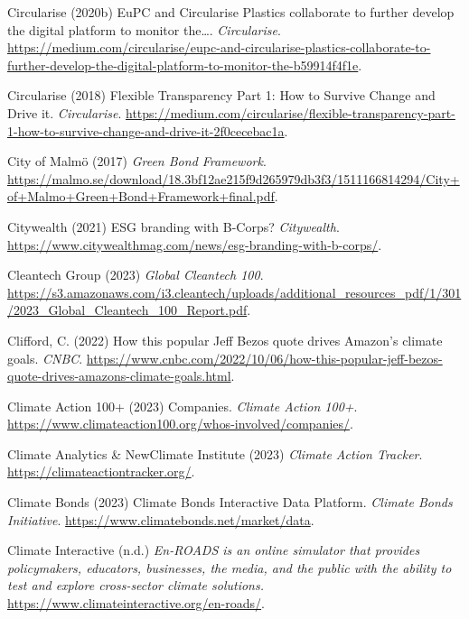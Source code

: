 \documentclass[
  letterpaper,
  DIV=11,
  numbers=noendperiod]{scrartcl}
\newlength{\cslhangindent}
\newenvironment{CSLReferences}[2] %
 {\begin{list}{}{%
  \setlength{\itemindent}{0pt}
  \setlength{\leftmargin}{0pt}
  \setlength{\parsep}{0pt}
  \ifodd #1
   \setlength{\leftmargin}{\cslhangindent}
   \setlength{\itemindent}{-1\cslhangindent}
  \fi
  \setlength{\itemsep}{#2\baselineskip}}}
 {\end{list}}
\begin{document}
\begin{CSLReferences}{0}{1}
Circularise (2020b) {EuPC} and {Circularise Plastics} collaborate to
further develop the digital platform to monitor the{\ldots{}}.
\emph{Circularise}.
\url{https://medium.com/circularise/eupc-and-circularise-plastics-collaborate-to-further-develop-the-digital-platform-to-monitor-the-b59914f4f1e}.

Circularise (2018) Flexible {Transparency Part} 1: {How} to {Survive
Change} and {Drive} it. \emph{Circularise}.
\url{https://medium.com/circularise/flexible-transparency-part-1-how-to-survive-change-and-drive-it-2f0cecebac1a}.

City of Malmö (2017) \emph{Green {Bond Framework}}.
\url{https://malmo.se/download/18.3bf12ae215f9d265979db3f3/1511166814294/City+of+Malmo+Green+Bond+Framework+final.pdf}.

Citywealth (2021) {ESG} branding with {B-Corps}? \emph{Citywealth}.
\url{https://www.citywealthmag.com/news/esg-branding-with-b-corps/}.

Cleantech Group (2023) \emph{Global {Cleantech} 100}.
\url{https://s3.amazonaws.com/i3.cleantech/uploads/additional_resources_pdf/1/301/2023_Global_Cleantech_100_Report.pdf}.

Clifford, C. (2022) How this popular {Jeff Bezos} quote drives
{Amazon}'s climate goals. \emph{CNBC}.
\url{https://www.cnbc.com/2022/10/06/how-this-popular-jeff-bezos-quote-drives-amazons-climate-goals.html}.

Climate Action 100+ (2023) Companies. \emph{Climate Action 100+}.
\url{https://www.climateaction100.org/whos-involved/companies/}.

Climate Analytics \& NewClimate Institute (2023) \emph{Climate {Action
Tracker}}. \url{https://climateactiontracker.org/}.

Climate Bonds (2023) Climate {Bonds Interactive Data Platform}.
\emph{Climate Bonds Initiative}.
\url{https://www.climatebonds.net/market/data}.

Climate Interactive (n.d.) \emph{En-{ROADS} is an online simulator that
provides policymakers, educators, businesses, the media, and the public
with the ability to test and explore cross-sector climate solutions.}
\url{https://www.climateinteractive.org/en-roads/}.


\end{CSLReferences}
\end{document}

